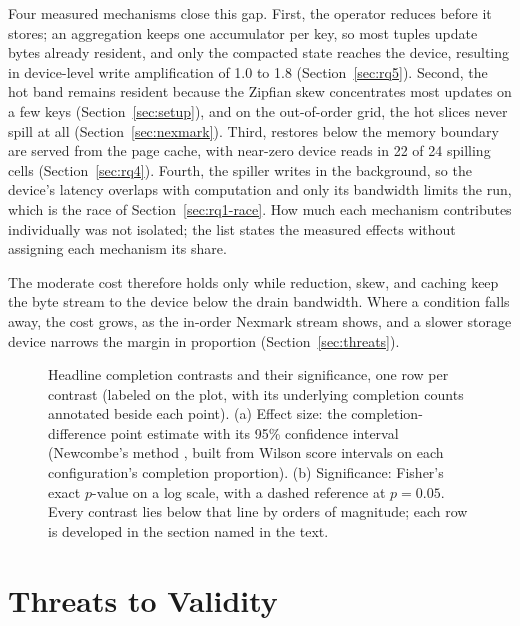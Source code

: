 Four measured mechanisms close this gap.
First, the operator reduces before it stores; an aggregation keeps one accumulator per key, so most tuples update bytes already resident, and only the compacted state reaches the device, resulting in device-level write amplification of 1.0 to 1.8 (Section~\ref{sec:rq5}).
Second, the hot band remains resident because the Zipfian skew concentrates most updates on a few keys (Section~\ref{sec:setup}), and on the out-of-order grid, the hot slices never spill at all (Section~\ref{sec:nexmark}).
Third, restores below the memory boundary are served from the page cache, with near-zero device reads in 22 of 24 spilling cells (Section~\ref{sec:rq4}).
Fourth, the spiller writes in the background, so the device's latency overlaps with computation and only its bandwidth limits the run, which is the race of Section~\ref{sec:rq1-race}.
How much each mechanism contributes individually was not isolated; the list states the measured effects without assigning each mechanism its share.

The moderate cost therefore holds only while reduction, skew, and caching keep the byte stream to the device below the drain bandwidth.
Where a condition falls away, the cost grows, as the in-order Nexmark stream shows, and a slower storage device narrows the margin in proportion (Section~\ref{sec:threats}).

\begin{figure}[htbp]
\centering
{}
\caption[Headline completion contrasts and their significance]{Headline
completion contrasts and their significance, one row per contrast (labeled on
the plot, with its underlying completion counts annotated beside each point).
(a) Effect size: the completion-difference point estimate with its 95\%
confidence interval (Newcombe's method \cite{newcombe1998}, built from Wilson score intervals on
each configuration's completion proportion). (b) Significance: Fisher's exact $p$-value on a log
scale, with a dashed reference at $p = 0.05$. Every contrast lies below that line
by orders of magnitude; each row is developed in the section named in the
text.\methodsnote}
\label{fig:pvalues}
\end{figure}

\section{Threats to Validity\label{sec:threats}}

